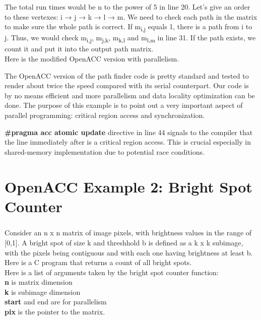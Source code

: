 \documentclass[ebook,10pt,oneside,openany]{memoir}
\begin{document}
The total run times would be n to the power of 5 in line 20. Let's give an order to these vertexes: i → j → k → l → m. We need to check each path in the matrix to make sure the whole path is correct.
If m\textsubscript{i,j} equals 1, there is a path from i to j. Thus, we would check m\textsubscript{i,j}, m\textsubscript{j,k}, m\textsubscript{k,l} and m\textsubscript{l,m} in line 31.
If the path exists, we count it and put it into the output path matrix. \\

Here is the modified OpenACC version with parallelism.



The OpenACC version of the path finder code is pretty standard and tested to render about twice the speed compared with its serial counterpart. Our code is by no means efficient and more parallelism and data locality optimization can be done. The purpose of this example is to point out a very important aspect of parallel programming: critical region access and synchronization.

\textbf{\#pragma acc atomic update} directive in line 44 signals to the compiler that the line immediately after is a critical region access. This is crucial especially in shared-memory implementation due to potential race conditions.

\chapter{OpenACC Example 2: Bright Spot Counter}

\paragraph{}
Consider an n x n matrix of image pixels, with brightness values in the range of [0,1]. A bright spot of size k and threshhold b is defined as a k x k subimage, with the pixels being contiguous and with each one having brightness at least b. Here is a C program that returns a count of all bright spots. \\

Here is a list of arguments taken by the bright spot counter function: \\
\textbf{n} is matrix dimension\\ 
\textbf{k} is subimage dimension\\ 
\textbf{start} and end are for parallelism\\
\textbf{pix} is the pointer to the matrix.\\
\end{document}
